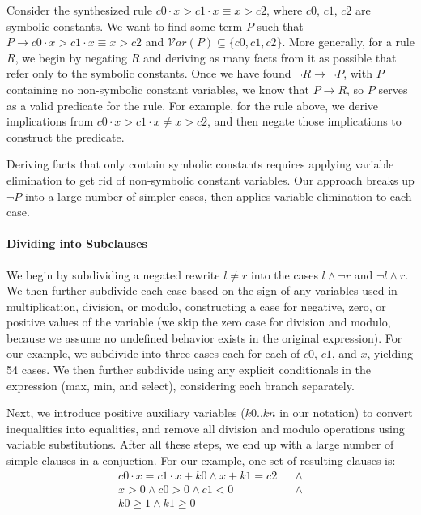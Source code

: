 \documentclass[sigplan,10pt,review,anonymous]{acmart}\settopmatter{printfolios=true,printccs=false,printacmref=false}
\begin{document}
Consider the synthesized rule $c0 \cdot x > c1 \cdot x \equiv x > c2$, where $c0$, $c1$,
$c2$ are symbolic constants. We want to find some term $P$ such that
$P \rightarrow c0 \cdot x > c1 \cdot x \equiv x > c2$ and
$\mathcal{V}ar(P) \subseteq \{c0, c1, c2\}$. More generally, for a rule $R$, we begin by
negating $R$ and deriving as many facts from it as possible that refer only to
the symbolic constants. Once we have found $\neg R \rightarrow \neg P$, with $P$ containing
no non-symbolic constant variables, we know that $P \rightarrow R$, so $P$ serves as a
valid predicate for the rule.  For example, for the rule above, we derive implications
from $c0 \cdot x > c1 \cdot x \neq x > c2$, and then negate those implications to
construct the predicate.

Deriving facts that only contain symbolic constants requires applying variable
elimination to get rid of non-symbolic constant variables.  Our approach breaks up $\neg P$ into
a large number of simpler cases, then applies variable elimination to each case.

\paragraph{Dividing into Subclauses} We begin by subdividing a negated rewrite $l \neq r$ into
the cases $l \wedge \neg r$ and $\neg l \wedge r$.  We then further subdivide each case based
on the sign of any variables used in multiplication, division, or modulo, constructing
a case for negative, zero, or positive values of the variable (we skip the zero case for
division and modulo, because we assume no undefined behavior exists in the original expression).
For our example, we subdivide into three cases each for each of $c0$, $c1$, and $x$, yielding
54 cases.  We then further subdivide using any explicit conditionals in the expression (max,
min, and select), considering each branch separately.

Next, we introduce positive auxiliary variables ($k0..kn$ in our notation) to convert
inequalities into equalities, and remove all division and modulo operations using
variable substitutions.  After all these steps, we end up with a large number of simple
clauses in a conjuction.  For our example, one set of resulting clauses is:
\begin{align*}
c0 \cdot x = c1 \cdot x + k0  \wedge x + k1 = c2 & & \wedge \\
x > 0 \wedge
c0 > 0 \wedge 
c1 < 0 & & \wedge  \\
k0 \geq 1 \wedge k1 \geq 0 & &
\end{align*}
\end{document}
